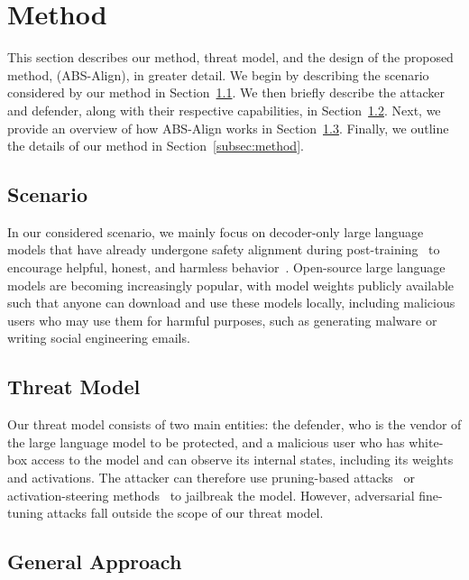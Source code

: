 \section{Method}
\label{sec:method}

This section describes our method, threat model, and the design of the proposed method, \method (ABS-Align), in greater detail. We begin by describing the scenario considered by our method in Section~\ref{subsec:scenairo}. We then briefly describe the attacker and defender, along with their respective capabilities, in Section~\ref{subsec:threat_model}. Next, we provide an overview of how ABS-Align works in Section~\ref{subsec:general_approach}. Finally, we outline the details of our method in Section~\ref{subsec:method}.

\subsection{Scenario}
\label{subsec:scenairo}
 In our considered scenario, we mainly focus on decoder-only large language models that have already undergone safety alignment during post-training~\cite{tulu3, ouyang2022rlhf, rafailov2023dpo} to encourage helpful, honest, and harmless behavior~\cite{ouyang2022rlhf}. Open-source large language models are becoming increasingly popular, with model weights publicly available such that anyone can download and use these models locally, including malicious users who may use them for harmful purposes, such as generating malware or writing social engineering emails.


\subsection{Threat Model}
\label{subsec:threat_model}

Our threat model consists of two main entities: the defender, who is the vendor of the large language model to be protected, and a malicious user who has white-box access to the model and can observe its internal states, including its weights and activations. The attacker can therefore use pruning-based attacks~\cite{twinbreak,wu2026neurostrike} or activation-steering methods~\cite{arditi2024refusal} to jailbreak the model. However, adversarial fine-tuning attacks fall outside the scope of our threat model.

\subsection{General Approach}
\label{subsec:general_approach}

